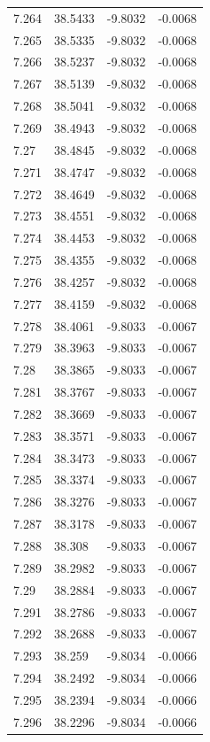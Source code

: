 \begin{tabular}{llll}
7.264 & 38.5433 & -9.8032 & -0.0068 \\
7.265 & 38.5335 & -9.8032 & -0.0068 \\
7.266 & 38.5237 & -9.8032 & -0.0068 \\
7.267 & 38.5139 & -9.8032 & -0.0068 \\
7.268 & 38.5041 & -9.8032 & -0.0068 \\
7.269 & 38.4943 & -9.8032 & -0.0068 \\
7.27 & 38.4845 & -9.8032 & -0.0068 \\
7.271 & 38.4747 & -9.8032 & -0.0068 \\
7.272 & 38.4649 & -9.8032 & -0.0068 \\
7.273 & 38.4551 & -9.8032 & -0.0068 \\
7.274 & 38.4453 & -9.8032 & -0.0068 \\
7.275 & 38.4355 & -9.8032 & -0.0068 \\
7.276 & 38.4257 & -9.8032 & -0.0068 \\
7.277 & 38.4159 & -9.8032 & -0.0068 \\
7.278 & 38.4061 & -9.8033 & -0.0067 \\
7.279 & 38.3963 & -9.8033 & -0.0067 \\
7.28 & 38.3865 & -9.8033 & -0.0067 \\
7.281 & 38.3767 & -9.8033 & -0.0067 \\
7.282 & 38.3669 & -9.8033 & -0.0067 \\
7.283 & 38.3571 & -9.8033 & -0.0067 \\
7.284 & 38.3473 & -9.8033 & -0.0067 \\
7.285 & 38.3374 & -9.8033 & -0.0067 \\
7.286 & 38.3276 & -9.8033 & -0.0067 \\
7.287 & 38.3178 & -9.8033 & -0.0067 \\
7.288 & 38.308 & -9.8033 & -0.0067 \\
7.289 & 38.2982 & -9.8033 & -0.0067 \\
7.29 & 38.2884 & -9.8033 & -0.0067 \\
7.291 & 38.2786 & -9.8033 & -0.0067 \\
7.292 & 38.2688 & -9.8033 & -0.0067 \\
7.293 & 38.259 & -9.8034 & -0.0066 \\
7.294 & 38.2492 & -9.8034 & -0.0066 \\
7.295 & 38.2394 & -9.8034 & -0.0066 \\
7.296 & 38.2296 & -9.8034 & -0.0066 \\

\end{tabular}
